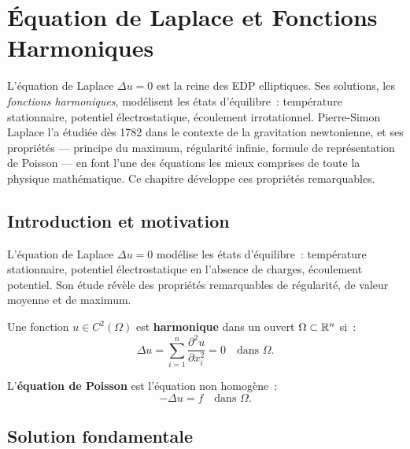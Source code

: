 \chapter{\'Equation de Laplace et Fonctions Harmoniques}
\label{ch:laplace}

L'\'equation de Laplace $\Delta u = 0$ est la reine des EDP elliptiques. Ses solutions, les \emph{fonctions harmoniques}, mod\'elisent les \'etats d'\'equilibre~: temp\'erature stationnaire, potentiel \'electrostatique, \'ecoulement irrotationnel. Pierre-Simon Laplace l'a \'etudi\'ee d\`es 1782 dans le contexte de la gravitation newtonienne, et ses propri\'et\'es --- principe du maximum, r\'egularit\'e infinie, formule de repr\'esentation de Poisson --- en font l'une des \'equations les mieux comprises de toute la physique math\'ematique. Ce chapitre d\'eveloppe ces propri\'et\'es remarquables.

\section{Introduction et motivation}

L'\'equation de Laplace $\Delta u = 0$ mod\'elise les \'etats d'\'equilibre~:
temp\'erature stationnaire, potentiel \'electrostatique en l'absence de
charges, \'ecoulement potentiel. Son \'etude r\'ev\`ele des propri\'et\'es
remarquables de r\'egularit\'e, de valeur moyenne et de maximum.

\begin{definition}
Une fonction $u \in C^2(\Omega)$ est \textbf{harmonique} dans un ouvert
$\Omega \subset \mathbb{R}^n$ si~:
\begin{equation}\label{eq:laplace}
    \Delta u = \sum_{i=1}^{n} \frac{\partial^2 u}{\partial x_i^2} = 0
    \quad \text{dans } \Omega.
\end{equation}
\end{definition}

\begin{definition}
L'\textbf{\'equation de Poisson} est l'\'equation non homog\`ene~:
\begin{equation}\label{eq:poisson}
    -\Delta u = f \quad \text{dans } \Omega.
\end{equation}
\end{definition}

\section{Solution fondamentale}

